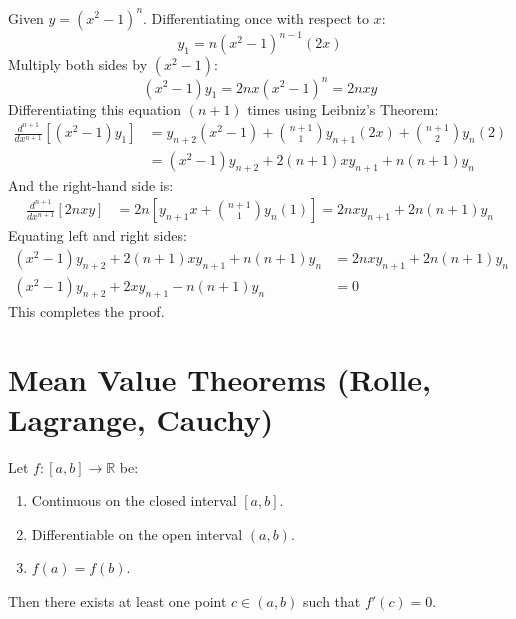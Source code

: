\begin{solutionbox}
Given $y = (x^2 - 1)^n$. Differentiating once with respect to $x$:
\begin{equation}
y_1 = n(x^2 - 1)^{n-1}(2x)
\end{equation}
Multiply both sides by $(x^2 - 1)$:
\begin{equation}
(x^2 - 1)y_1 = 2n x (x^2 - 1)^n = 2n x y
\end{equation}
Differentiating this equation $(n+1)$ times using Leibniz's Theorem:
\begin{align}
\frac{d^{n+1}}{dx^{n+1}}[(x^2 - 1)y_1] &= y_{n+2}(x^2 - 1) + \binom{n+1}{1}y_{n+1}(2x) + \binom{n+1}{2}y_n(2) \\
&= (x^2 - 1)y_{n+2} + 2(n+1)x y_{n+1} + n(n+1)y_n
\end{align}
And the right-hand side is:
\begin{align}
\frac{d^{n+1}}{dx^{n+1}}[2n x y] &= 2n \left[ y_{n+1} x + \binom{n+1}{1}y_n(1) \right] = 2n x y_{n+1} + 2n(n+1)y_n
\end{align}
Equating left and right sides:
\begin{align}
(x^2 - 1)y_{n+2} + 2(n+1)x y_{n+1} + n(n+1)y_n &= 2n x y_{n+1} + 2n(n+1)y_n \\
(x^2 - 1)y_{n+2} + 2x y_{n+1} - n(n+1)y_n &= 0
\end{align}
This completes the proof.
\end{solutionbox}

\section{Mean Value Theorems (Rolle, Lagrange, Cauchy)}

\begin{theorem}
Let $f:[a,b] \to \mathbb{R}$ be:
\begin{enumerate}[leftmargin=1.5em]
    \item Continuous on the closed interval $[a,b]$.
    \item Differentiable on the open interval $(a,b)$.
    \item $f(a) = f(b)$.
\end{enumerate}
Then there exists at least one point $c \in (a,b)$ such that $f'(c) = 0$.
\end{theorem}

